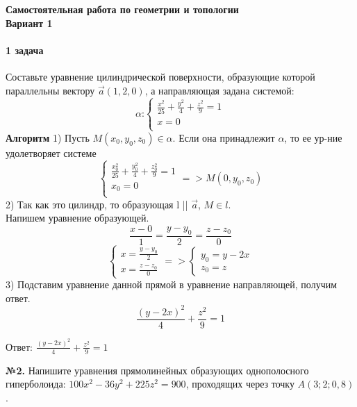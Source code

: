 \documentclass[a4paper,14pt]{extreport} %
\begin{document}
  
\begin{center}
    \textbf{Самостоятельная работа по геометрии и топологии} \\
    \textbf{Вариант 1}
\end{center}

\noindent


\paragraph {1 задача}
 Составьте уравнение цилиндрической поверхности, образующие которой параллельны вектору $\vec{a} (1,2,0)$, а направляющая задана системой:
\[
  \alpha \text{:}
\begin{cases}
    \frac{x^2}{25} + \frac{y^2}{4}+ \frac{z^2}{9}= 1 \\
    x = 0\\
\end{cases}
\]
\textbf{Алгоритм}
1) Пусть $M(x_0, y_0, z_0) \in \alpha$.  Если она принадлежит $\alpha$, 
то ее ур-ние удолетворяет системе
\[  
\begin{cases}
    \frac{x_0^2}{25} + \frac{y_0^2}{4}+ \frac{z_0^2}{9}= 1 \\
    x_0 = 0\\
\end{cases}
=> M(0, y_0, z_0)
\]
2) Так как это цилиндр, то образующая l || $\vec{a}$, $M \in l$. \\ 
Напишем уравнение образующей. 
\[
  \frac{x-0}{1} = \frac{y-y_0}{2} = \frac{z-z_0}{0}
\]
\[
  \begin{cases}
     x = \frac{y-y_0}{2}\\ 
     x = \frac{z-z_0}{0}
  \end{cases} => 
  \begin{cases}
    y_0 = y - 2x \\ 
    z_0 = z
  \end{cases} 
\]
3) Подставим уравнение данной прямой в уравнение направляющей, получим ответ. 
\[
  \frac{(y-2x)^2}{4} + \frac{z^2}{9} = 1
\]

Ответ: $\frac{(y-2x)^2}{4} + \frac{z^2}{9} = 1$

\noindent
\textbf{№2.} Напишите уравнения прямолинейных образующих однополосного гиперболоида: $100x^2 - 36y^2 + 225z^2 = 900$, проходящих через точку $A(3; 2; 0,8)$.
\end{document}
